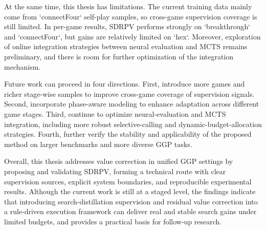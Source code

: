At the same time, this thesis has limitations. The current training data mainly come from `connectFour` self-play samples, so cross-game supervision coverage is still limited. In per-game results, SDRPV performs strongly on `breakthrough` and `connectFour`, but gains are relatively limited on `hex`. Moreover, exploration of online integration strategies between neural evaluation and MCTS remains preliminary, and there is room for further optimization of the integration mechanism.


Future work can proceed in four directions. First, introduce more games and richer stage-wise samples to improve cross-game coverage of supervision signals. Second, incorporate phase-aware modeling to enhance adaptation across different game stages. Third, continue to optimize neural-evaluation and MCTS integration, including more robust selective-calling and dynamic-budget-allocation strategies. Fourth, further verify the stability and applicability of the proposed method on larger benchmarks and more diverse GGP tasks.

% 

Overall, this thesis addresses value correction in unified GGP settings by proposing and validating SDRPV, forming a technical route with clear supervision sources, explicit system boundaries, and reproducible experimental results. Although the current work is still at a staged level, the findings indicate that introducing search-distillation supervision and residual value correction into a rule-driven execution framework can deliver real and stable search gains under limited budgets, and provides a practical basis for follow-up research.

